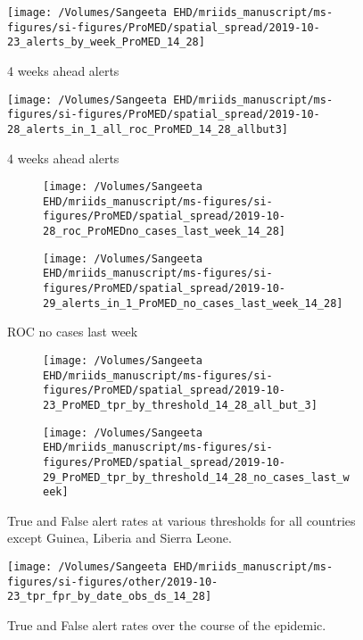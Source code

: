 \documentclass[9pt,twoside,lineno]{pnas-new}
\begin{document}
\begin{figure}
\centering
\texttt{[image: /Volumes/Sangeeta EHD/mriids\_manuscript/ms-figures/si-figures/ProMED/spatial\_spread/2019-10-23\_alerts\_by\_week\_ProMED\_14\_28]}
\caption{4 weeks ahead alerts}
\label{fig:alerts4weekahead}
\end{figure}\FloatBarrier


\begin{figure}
\centering
\texttt{[image: /Volumes/Sangeeta EHD/mriids\_manuscript/ms-figures/si-figures/ProMED/spatial\_spread/2019-10-28\_alerts\_in\_1\_all\_roc\_ProMED\_14\_28\_allbut3]}
\caption{4 weeks ahead alerts}
\label{fig:alertsallbut3}
\end{figure}\FloatBarrier

\begin{figure}
\centering
\begin{subfigure}[b]{0.45\textwidth}
\texttt{[image: /Volumes/Sangeeta EHD/mriids\_manuscript/ms-figures/si-figures/ProMED/spatial\_spread/2019-10-28\_roc\_ProMEDno\_cases\_last\_week\_14\_28]}
\end{subfigure}
\begin{subfigure}[b]{0.45\textwidth}
\texttt{[image: /Volumes/Sangeeta
  EHD/mriids\_manuscript/ms-figures/si-figures/ProMED/spatial\_spread/2019-10-29\_alerts\_in\_1\_ProMED\_no\_cases\_last\_week\_14\_28]}
\end{subfigure}
\caption{ROC no cases last week}
\label{fig:rocnocases}
\end{figure}\FloatBarrier



\begin{figure}
\centering
\begin{subfigure}[b]{0.45\textwidth}
\texttt{[image: /Volumes/Sangeeta EHD/mriids\_manuscript/ms-figures/si-figures/ProMED/spatial\_spread/2019-10-23\_ProMED\_tpr\_by\_threshold\_14\_28\_all\_but\_3]}
\end{subfigure}
\begin{subfigure}[b]{0.45\textwidth}
\texttt{[image: /Volumes/Sangeeta
  EHD/mriids\_manuscript/ms-figures/si-figures/ProMED/spatial\_spread/2019-10-29\_ProMED\_tpr\_by\_threshold\_14\_28\_no\_cases\_last\_week]}
\end{subfigure}
\caption{True and False alert rates at various thresholds for all
  countries except Guinea, Liberia and Sierra Leone.}
\label{fig:tprbythreshold}
\end{figure}\FloatBarrier


\begin{figure}
\centering
\texttt{[image: /Volumes/Sangeeta EHD/mriids\_manuscript/ms-figures/si-figures/other/2019-10-23\_tpr\_fpr\_by\_date\_obs\_ds\_14\_28]}
\caption{True and False alert rates over the course of the epidemic.}
\label{fig:tprovertime}
\end{figure}\FloatBarrier
\end{document}
